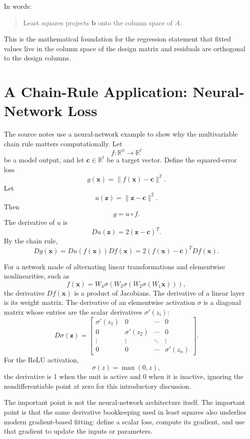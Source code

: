 In words:
\begin{quote}
Least squares projects \(\mathbf{b}\) onto the column space of \(A\).
\end{quote}

This is the mathematical foundation for the regression statement that fitted values live in the column space of the design matrix and residuals are orthogonal to the design columns.

\section{A Chain-Rule Application: Neural-Network Loss}
\label{mf:chain-rule-neural-network-bridge}

The source notes use a neural-network example to show why the multivariable chain rule matters computationally. Let
\[
    f:\mathbb{R}^n\to\mathbb{R}^t
\]
be a model output, and let \(\mathbf{c}\in\mathbb{R}^t\) be a target vector. Define the squared-error loss
\[
    g(\mathbf{x})=\|f(\mathbf{x})-\mathbf{c}\|^2.
\]
Let
\[
    u(\mathbf{z})=\|\mathbf{z}-\mathbf{c}\|^2.
\]
Then
\[
    g=u\circ f.
\]
The derivative of \(u\) is
\[
    Du(\mathbf{z})=2(\mathbf{z}-\mathbf{c})^T.
\]
By the chain rule,
\[
    Dg(\mathbf{x})=Du(f(\mathbf{x}))Df(\mathbf{x})
    =2(f(\mathbf{x})-\mathbf{c})^T Df(\mathbf{x}).
\]

For a network made of alternating linear transformations and elementwise nonlinearities, such as
\[
    f(\mathbf{x})=W_4\sigma(W_3\sigma(W_2\sigma(W_1\mathbf{x}))),
\]
the derivative \(Df(\mathbf{x})\) is a product of Jacobians. The derivative of a linear layer is its weight matrix. The derivative of an elementwise activation \(\sigma\) is a diagonal matrix whose entries are the scalar derivatives \(\sigma'(z_i)\):
\[
    D\sigma(\mathbf{z})=\begin{bmatrix}
        \sigma'(z_1) & 0 & \cdots & 0\\
        0 & \sigma'(z_2) & \cdots & 0\\
        \vdots & \vdots & \ddots & \vdots\\
        0 & 0 & \cdots & \sigma'(z_n)
    \end{bmatrix}.
\]
For the ReLU activation,
\[
    \sigma(z)=\max(0,z),
\]
the derivative is 1 when the unit is active and 0 when it is inactive, ignoring the nondifferentiable point at zero for this introductory discussion.

The important point is not the neural-network architecture itself. The important point is that the same derivative bookkeeping used in least squares also underlies modern gradient-based fitting: define a scalar loss, compute its gradient, and use that gradient to update the inputs or parameters.

